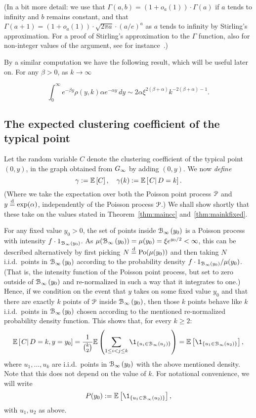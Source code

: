 \noindent
(In a bit more detail: we use that 
$\Gamma(a,b) = (1+o_a(1))\cdot \Gamma(a)$ if $a$ tends to infinity and $b$ remains constant, and that 
$\Gamma(a+1) = (1+o_a(1))\cdot \sqrt{2\pi a} \cdot (a/e)^{a}$ as $a$ tends to infinity by Stirling's approximation. For a proof of Stirling's approximation to the $\Gamma$ function, also for non-integer values of the argument, see for instance~\cite{DiaconisFreedman}.)


By a similar computation we have the following result, which will be useful later on. For any $\beta > 0$, as $k \to \infty$

\begin{equation}\label{eq:general_integral_rho_y_k}
	\int_0^\infty e^{-\beta y} \rho(y, k) \alpha e^{-\alpha y} \, dy
    \sim 2\alpha \xi^{2(\beta + \alpha)} k^{-2(\beta + \alpha)-1}.
\end{equation}



\subsection{The expected clustering coefficient of the typical point\label{sec:42}}


Let the random variable $C$ denote the clustering coefficient of the typical point $(0,y)$, in the graph obtained from $G_{\infty}$ by adding $(0,y)$. We now {\em define}
\[
	\gamma := \mathbb{E}\left[C\right], \quad \gamma(k) := \mathbb{E}\left[\left.C\right|D = k\right].
\]
(Where we take the expectation over both the Poisson point process ${\mathcal P}$ and $y \stackrel{\text{d}}{=} \text{exp}(\alpha)$, independently of the Poisson process ${\mathcal P}$.) We shall show shortly that these take on the values stated in Theorem~\ref{thm:maincc} and~\ref{thm:mainkfixed}.


For any fixed value $y_0>0$, the set of points inside ${\mathcal B}_{\infty}\left(y_0\right)$ is a Poisson process with intensity $f \cdot 1_{{\mathcal B}_{\infty}\left(y_0\right)}$. As $\mu({\mathcal B}_{\infty}\left(y_0\right)) = \mu(y_0) = \xi e^{y_0/2} < \infty$, this can be described alternatively by first picking $N \stackrel{\text{d}}{=} {\mathrm{Po}}( \mu(y_0) )$ and then taking $N$ i.i.d.~points in ${\mathcal B}_{\infty}\left(y_0\right)$ according to the probability density $f \cdot 1_{{\mathcal B}_{\infty}\left(y_0\right)} / \mu(y_0)$. (That is, the intensity function of the Poisson point process, but set to zero outside of ${\mathcal B}_{\infty}\left(y_0\right)$ and re-normalized in such a way that it integrates to one.) Hence, if we condition on the event that $y$ takes on some fixed value $y_0$ and that there are exactly $k$ points of ${\mathcal P}$ inside ${\mathcal B}_{\infty}\left(y_0\right)$, then those $k$ points behave like $k$ i.i.d.~points in ${\mathcal B}_{\infty}\left(y_0\right)$ chosen according to the mentioned re-normalized probability density function. This shows that, for every $k\geq 2$:
\[
	\CExp{C}{D=k, y=y_0} 
	= \frac{1}{\binom{k}{2}} \Ee\left( \sum_{1\leq i < j \leq k} \1_{\{u_i\in \BallPo{u_j}\}} \right)
	= \Exp{\1_{\{u_1\in\BallPo{u_2}\}}},
\]
where $u_1,\dots, u_k$ are i.i.d.~points in ${\mathcal B}_{\infty}\left(y_0\right)$ with the above mentioned density.
Note that this does not depend on the value of $k$. For notational convenience, we will write 
\begin{equation}\label{eq:def_Py}
	P(y_0) := \Exp{\1_{\{u_1\in\BallPo{u_2}\}}},
\end{equation}
with $u_1, u_2$ as above.

